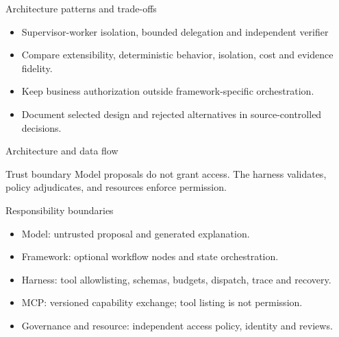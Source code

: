 \documentclass[aspectratio=169,10pt]{beamer}
\begin{document}
\begin{frame}{Architecture patterns and trade-offs}
\small
\begin{itemize}
\item Supervisor-worker isolation, bounded delegation and independent verifier
\item Compare extensibility, deterministic behavior, isolation, cost and evidence fidelity.
\item Keep business authorization outside framework-specific orchestration.
\item Document selected design and rejected alternatives in source-controlled decisions.
\end{itemize}

\end{frame}

\begin{frame}{Architecture and data flow}
\small
\centering
{}
\vspace{0.6cm}
\begin{block}{Trust boundary}
Model proposals do not grant access. The harness validates, policy adjudicates, and resources enforce permission.
\end{block}
\end{frame}

\begin{frame}{Responsibility boundaries}
\small
\begin{itemize}
\item Model: untrusted proposal and generated explanation.
\item Framework: optional workflow nodes and state orchestration.
\item Harness: tool allowlisting, schemas, budgets, dispatch, trace and recovery.
\item MCP: versioned capability exchange; tool listing is not permission.
\item Governance and resource: independent access policy, identity and reviews.
\end{itemize}

\end{frame}
\end{document}
